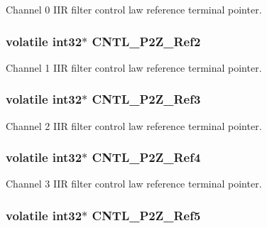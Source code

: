 Channel 0 I\-I\-R filter control law reference terminal pointer. \hypertarget{a00009_a9bf1756a901a3a74d9f43a51f85cede4}{
\subsubsection[{C\-N\-T\-L\-\_\-2\-P2\-Z\-\_\-\-Ref2}]{\setlength{\rightskip}{0pt plus 5cm}volatile int32$\ast$ C\-N\-T\-L\-\_\-P2\-Z\-\_\-\-Ref2}}\label{a00009_a9bf1756a901a3a74d9f43a51f85cede4}
Channel 1 I\-I\-R filter control law reference terminal pointer. \hypertarget{a00009_a859e9bbd5bc82f1b42863a93e4f992af}{
\subsubsection[{C\-N\-T\-L\-\_\-2\-P2\-Z\-\_\-\-Ref3}]{\setlength{\rightskip}{0pt plus 5cm}volatile int32$\ast$ C\-N\-T\-L\-\_\-P2\-Z\-\_\-\-Ref3}}\label{a00009_a859e9bbd5bc82f1b42863a93e4f992af}
Channel 2 I\-I\-R filter control law reference terminal pointer. \hypertarget{a00009_af54c55f228deb8189c44282a94a870c1}{
\subsubsection[{C\-N\-T\-L\-\_\-2\-P2\-Z\-\_\-\-Ref4}]{\setlength{\rightskip}{0pt plus 5cm}volatile int32$\ast$ C\-N\-T\-L\-\_\-P2\-Z\-\_\-\-Ref4}}\label{a00009_af54c55f228deb8189c44282a94a870c1}
Channel 3 I\-I\-R filter control law reference terminal pointer. \hypertarget{a00009_abd3b240e2d3f7d3f4f717066ee8efd3e}{
\subsubsection[{C\-N\-T\-L\-\_\-2\-P2\-Z\-\_\-\-Ref5}]{\setlength{\rightskip}{0pt plus 5cm}volatile int32$\ast$ C\-N\-T\-L\-\_\-P2\-Z\-\_\-\-Ref5}}\label{a00009_abd3b240e2d3f7d3f4f717066ee8efd3e}
